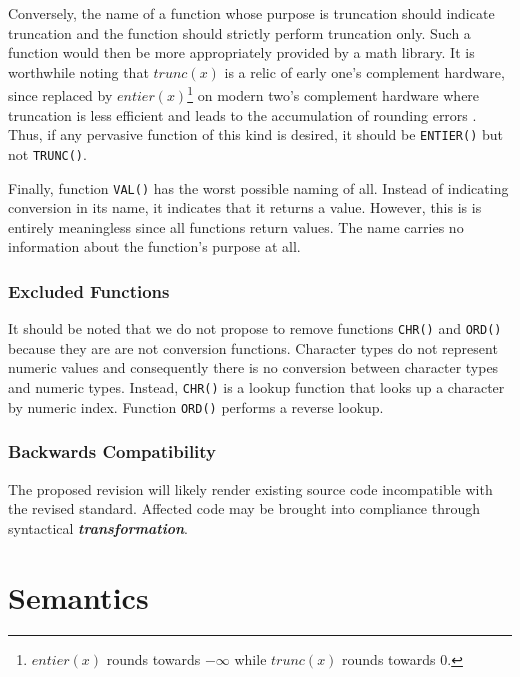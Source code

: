 \documentclass[10pt,a4paper,leqno,fleqn]{article}
\renewcommand{\emph}[1]{\textbf{\textit{#1}}}
\begin{document}
Conversely, the name of a function whose purpose is truncation should indicate
truncation and the function should strictly perform truncation only. Such a function
would then be more appropriately provided by a math library. It is worthwhile noting
that $trunc(x)$ is a relic of early one's complement hardware, since replaced
by $entier(x)$\footnote
{$entier(x)$ rounds towards $-\infty$ while $trunc(x)$ rounds towards $0$.}
on modern two's complement hardware where truncation is less
efficient and leads to the accumulation of rounding errors \cite{Tucker04}. Thus,
if any pervasive function of this kind is desired, it should be \verb|ENTIER()| but
not \verb|TRUNC()|.

Finally, function \verb|VAL()| has the worst possible naming of all.
Instead of indicating conversion in its name, it indicates that it returns a value.
However, this is is entirely meaningless since all functions return values. The
name carries no information about the function's purpose at all.


\subsubsection{Excluded Functions}

It should be noted that we do not propose to remove functions \verb|CHR()| and
\verb|ORD()| because they are are not conversion functions. Character types do
not represent numeric values and consequently there is no conversion between
character types and numeric types. Instead, \verb|CHR()| is a lookup function that
looks up a character by numeric index. Function \verb|ORD()| performs a reverse lookup.

\subsubsection{Backwards Compatibility}

The proposed revision will likely render existing source code incompatible with
the revised standard. Affected code may be brought into compliance
through syntactical \emph{transformation}.


\section{Semantics}

\end{document}
